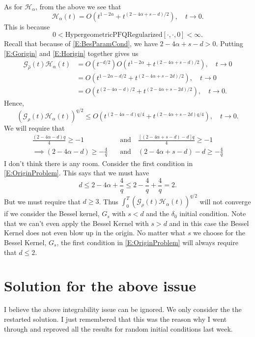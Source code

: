 \documentclass{article}
\numberwithin{equation}{section}
\begin{document}
As for $\mathcal{H}_\alpha$, from the above we see that
	\begin{equation}\label{E:Horigin}
		\mathcal{H}_\alpha(t) = O\left(t^{1-2\alpha}  + t^{(2 - 4\alpha + s -d)/2}\right), \quad t \to 0.
	\end{equation}
This is because
	\[
		0< \text{HypergeometricPFQRegularized}\left[ \cdot, \cdot, 0 \right] < \infty.
	\]
Recall that because of \eqref{E:BesParamCond}, we have $2 - 4\alpha + s -d > 0$. Putting \eqref{E:Gorigin} and \eqref{E:Horigin} together gives us
	\begin{align}
				\mathcal{G}_{\widehat{\rho}} (t)\mathcal{H}_\alpha(t) &= O(t^{-d/2}) O\left(t^{1-2\alpha }  + t^{(2 - 4\alpha + s -d)/2}\right), \quad t \to 0 \nonumber \\
				&= O\left(t^{1-2\alpha - d/2}  + t^{(2 - 4\alpha + s - 2d)/2}\right), \quad t \to 0 \nonumber \\
				&= O\left(t^{(2- 4\alpha - d)/2}  + t^{(2 - 4\alpha + s - 2d)/2}\right), \quad t \to 0 .
	\end{align}
Hence,
	\begin{equation}
		\left(\mathcal{G}_{\rho}(t) \mathcal{H}_{\alpha}(t)\right)^{q/2} \le O\left(t^{(2- 4\alpha - d)q/4}  + t^{(2 - 4\alpha + s - 2d)q/4}\right), \quad t \to 0 .
	\end{equation}
We will require that
	\begin{align}
		\frac{(2- 4\alpha - d)q}{4} \ge -1 \quad &\text{and} \quad \frac{[(2 - 4\alpha + s - d) - d]q}{4} \ge -1 \nonumber \\
		\implies (2- 4\alpha - d) \ge -\frac{4}{q} \quad &\text{and} \quad (2 - 4\alpha + s - d) - d \ge -\frac{4}{q} \label{E:OriginProblem}
	\end{align}
I don't think there is any room. Consider the first condition in \eqref{E:OriginProblem}. This says that we must have
	\[
		d \le 2 - 4\alpha + \frac{4}{q} \le 2 - \frac{4}{q} + \frac{4}{q} = 2.
	\]
But we must require that $d \ge 3$. Thus $	\int_0^T \left(\mathcal{G}_{\rho}(t) \mathcal{H}_{\alpha}(t)\right)^{q/2}$ will not converge if we consider the Bessel kernel, $G_s$ with $s < d$ and the $\delta_0$ initial condition. Note that we can't even apply the Bessel Kernel with $s >d$ and in this case the Bessel Kernel does not even blow up in the origin. No matter what $s$ we choose for the Bessel Kernel, $G_s$, the first condition in \eqref{E:OriginProblem} will always require that $d \le 2$.

\section{Solution for the above issue}
I believe the above integrability issue can be ignored. We only consider the the restarted solution. I just remembered that this was the reason why I went through and reproved all the results for random initial conditions last week.
\end{document}
